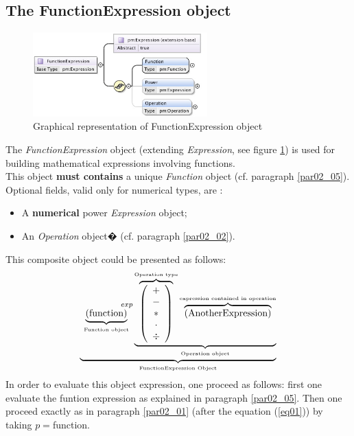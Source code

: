 \documentclass[a4paper,11pt] {ivoa}
\begin{document}
\subsection{The FunctionExpression object} \label{functionExpressionPar}
\begin{figure}[htbp]
\begin{center}
\includegraphics[width=0.6\textwidth]{pictures/FunctionExpression.jpg} 
\caption{Graphical representation of FunctionExpression object}
\label{Pic-FunctionExpression}
\end{center}
\end{figure}
The {\it FunctionExpression} object (extending {\it Expression}, see figure
\ref{Pic-FunctionExpression}) is used for building mathematical expressions involving functions.\\
This object {\bf must contains} a unique {\it Function} object (cf. paragraph \ref{par02_05}).\\
Optional fields, valid only for numerical types, are :
\begin{itemize}
\item A {\bf numerical} power {\it Expression} object;
\item An {\it Operation} object� (cf. paragraph \ref{par02_02}).\\
\end{itemize}

This composite object could be presented as follows:
\begin{equation}
 \underbrace{    \underbrace{ \left(\mbox{function}\right) }_{\mbox{\tiny Function object}} ^{\hspace{15mm}exp} \underbrace{  \overbrace{\left( \begin{array}{c} + \\ - \\ \ast  \\ \cdot \\ \div   \end{array} \right) }^{\mbox{\tiny Operation type}}
 \overbrace{    \left( \mbox{AnotherExpression}\right) }^{\mbox{\tiny expression contained in operation}}   }_{\mbox{\tiny Operation object}}}_{\mbox{\tiny FunctionExpression Object}}
\end{equation}
In order to evaluate this object expression, one proceed as follows: first one evaluate the funtion
expression as explained in paragraph  \ref{par02_05}. Then one proceed exactly as in paragraph
\ref{par02_01} (after the equation (\ref{eq01})) by taking $p=$function.
\end{document}
